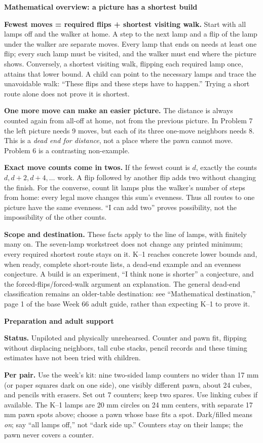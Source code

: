 \documentclass[11pt]{article}
\newcommand{\head}[1]{\par\textbf{\large #1}\par}
\begin{document}
\head{Mathematical overview: a picture has a shortest build}
\textbf{Fewest moves = required flips + shortest visiting walk.} Start with all lamps off and the walker at home. A step to the next lamp and a flip of the lamp under the walker are separate moves. Every lamp that ends on needs at least one flip; every such lamp must be visited, and the walker must end where the picture shows. Conversely, a shortest visiting walk, flipping each required lamp once, attains that lower bound. A child can point to the necessary lamps and trace the unavoidable walk: ``These flips and these steps have to happen.'' Trying a short route alone does not prove it is shortest.

\textbf{One more move can make an easier picture.} The distance is always counted again from all-off at home, not from the previous picture. In Problem 7 the left picture needs 9 moves, but each of its three one-move neighbors needs 8. This is a \emph{dead end for distance}, not a place where the pawn cannot move. Problem 6 is a contrasting non-example.

\textbf{Exact move counts come in twos.} If the fewest count is $d$, exactly the counts $d,d+2,d+4,\ldots$ work. A flip followed by another flip adds two without changing the finish. For the converse, count lit lamps plus the walker's number of steps from home: every legal move changes this sum's evenness. Thus all routes to one picture have the same evenness. ``I can add two'' proves possibility, not the impossibility of the other counts.

\textbf{Scope and destination.} These facts apply to the line of lamps, with finitely many on. The seven-lamp workstreet does not change any printed minimum; every required shortest route stays on it. K--1 reaches concrete lower bounds and, when ready, complete short-route lists, a dead-end example and an evenness conjecture. A build is an experiment, ``I think none is shorter'' a conjecture, and the forced-flips/forced-walk argument an explanation. The general dead-end classification remains an older-table destination: see ``Mathematical destination,'' page 1 of the base Week 66 adult guide, rather than expecting K--1 to prove it.

\head{Preparation and adult support}
\textbf{Status.} Unpiloted and physically unrehearsed. Counter and pawn fit, flipping without displacing neighbors, tall cube stacks, pencil records and these timing estimates have not been tried with children.

\textbf{Per pair.} Use the week's kit: nine two-sided lamp counters no wider than 17 mm (or paper squares dark on one side), one visibly different pawn, about 24 cubes, and pencils with erasers. Set out 7 counters; keep two spares. Use linking cubes if available. The K--1 lamps are 20 mm circles on 24 mm centers, with separate 17 mm pawn spots above; choose a pawn whose base fits a spot. Dark/filled means \emph{on}; say ``all lamps off,'' not ``dark side up.'' Counters stay on their lamps; the pawn never covers a counter.
\end{document}
